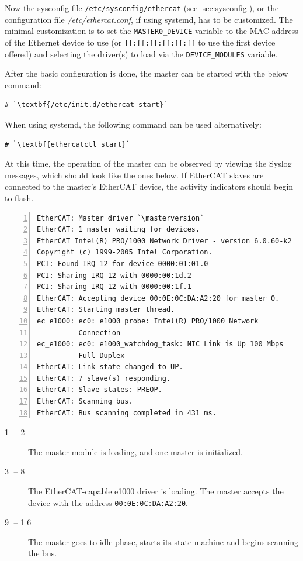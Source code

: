 \documentclass[a4paper,12pt,BCOR6mm,bibtotoc,idxtotoc]{scrbook}
\newcommand{\masterversion}{1.5.2}
\newcommand{\linenum}[1]{\normalfont\textcircled{\tiny #1}}
\begin{document}
Now the sysconfig file \texttt{/etc/sysconfig/ethercat} (see
\autoref{sec:sysconfig}), or the configuration file
\textit{/etc/ethercat.conf}, if using systemd, has to be customized. The
minimal customization is to set the \lstinline+MASTER0_DEVICE+ variable to the
MAC address of the Ethernet device to use (or \lstinline+ff:ff:ff:ff:ff:ff+ to
use the first device offered) and selecting the driver(s) to load via the
\lstinline+DEVICE_MODULES+ variable.

After the basic configuration is done, the master can be started with the
below command:

\begin{lstlisting}
# `\textbf{/etc/init.d/ethercat start}`
\end{lstlisting}

When using systemd, the following command can be used alternatively:

\begin{lstlisting}
# `\textbf{ethercatctl start}`
\end{lstlisting}

At this time, the operation of the master can be observed by viewing the
Syslog messages, which should look like the ones below. If
EtherCAT slaves are connected to the master's EtherCAT device, the activity
indicators should begin to flash.

\begin{lstlisting}[numbers=left]
EtherCAT: Master driver `\masterversion`
EtherCAT: 1 master waiting for devices.
EtherCAT Intel(R) PRO/1000 Network Driver - version 6.0.60-k2
Copyright (c) 1999-2005 Intel Corporation.
PCI: Found IRQ 12 for device 0000:01:01.0
PCI: Sharing IRQ 12 with 0000:00:1d.2
PCI: Sharing IRQ 12 with 0000:00:1f.1
EtherCAT: Accepting device 00:0E:0C:DA:A2:20 for master 0.
EtherCAT: Starting master thread.
ec_e1000: ec0: e1000_probe: Intel(R) PRO/1000 Network
          Connection
ec_e1000: ec0: e1000_watchdog_task: NIC Link is Up 100 Mbps
          Full Duplex
EtherCAT: Link state changed to UP.
EtherCAT: 7 slave(s) responding.
EtherCAT: Slave states: PREOP.
EtherCAT: Scanning bus.
EtherCAT: Bus scanning completed in 431 ms.
\end{lstlisting}

\begin{description}

\item[\linenum{1} -- \linenum{2}] The master module is loading, and one master
is initialized.

\item[\linenum{3} -- \linenum{8}] The EtherCAT-capable e1000 driver is
loading. The master accepts the device with the address
\lstinline+00:0E:0C:DA:A2:20+.

\item[\linenum{9} -- \linenum{16}] The master goes to idle phase, starts its
state machine and begins scanning the bus.

\end{description}
\end{document}
